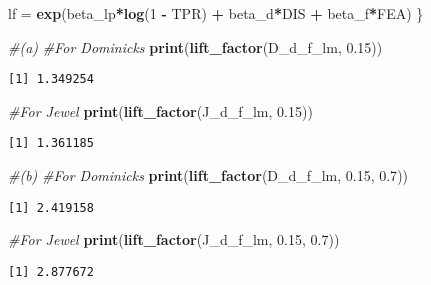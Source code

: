 \documentclass[]{article}
\newenvironment{Shaded}{\begin{snugshade}}{\end{snugshade}}
\newcommand{\CommentTok}[1]{\textcolor[rgb]{0.56,0.35,0.01}{\textit{#1}}}
\newcommand{\DecValTok}[1]{\textcolor[rgb]{0.00,0.00,0.81}{#1}}
\newcommand{\FloatTok}[1]{\textcolor[rgb]{0.00,0.00,0.81}{#1}}
\newcommand{\KeywordTok}[1]{\textcolor[rgb]{0.13,0.29,0.53}{\textbf{#1}}}
\newcommand{\NormalTok}[1]{#1}
\newcommand{\OperatorTok}[1]{\textcolor[rgb]{0.81,0.36,0.00}{\textbf{#1}}}
\newcommand{\StringTok}[1]{\textcolor[rgb]{0.31,0.60,0.02}{#1}}
\begin{document}
\begin{Shaded}
\begin{Highlighting}[]
\NormalTok{  lf =}\StringTok{ }\KeywordTok{exp}\NormalTok{(beta_lp}\OperatorTok{*}\KeywordTok{log}\NormalTok{(}\DecValTok{1} \OperatorTok{-}\StringTok{ }\NormalTok{TPR) }\OperatorTok{+}\StringTok{ }\NormalTok{beta_d}\OperatorTok{*}\NormalTok{DIS }\OperatorTok{+}\StringTok{ }\NormalTok{beta_f}\OperatorTok{*}\NormalTok{FEA)}
\NormalTok{\}}


\CommentTok{#(a)}
\CommentTok{#For Dominicks}
\KeywordTok{print}\NormalTok{(}\KeywordTok{lift_factor}\NormalTok{(D_d_f_lm, }\FloatTok{0.15}\NormalTok{))}
\end{Highlighting}
\end{Shaded}

\begin{verbatim}
[1] 1.349254
\end{verbatim}

\begin{Shaded}
\begin{Highlighting}[]
\CommentTok{#For Jewel}
\KeywordTok{print}\NormalTok{(}\KeywordTok{lift_factor}\NormalTok{(J_d_f_lm, }\FloatTok{0.15}\NormalTok{))}
\end{Highlighting}
\end{Shaded}

\begin{verbatim}
[1] 1.361185
\end{verbatim}

\begin{Shaded}
\begin{Highlighting}[]
\CommentTok{#(b)}
\CommentTok{#For Dominicks}
\KeywordTok{print}\NormalTok{(}\KeywordTok{lift_factor}\NormalTok{(D_d_f_lm, }\FloatTok{0.15}\NormalTok{, }\FloatTok{0.7}\NormalTok{))}
\end{Highlighting}
\end{Shaded}

\begin{verbatim}
[1] 2.419158
\end{verbatim}

\begin{Shaded}
\begin{Highlighting}[]
\CommentTok{#For Jewel}
\KeywordTok{print}\NormalTok{(}\KeywordTok{lift_factor}\NormalTok{(J_d_f_lm, }\FloatTok{0.15}\NormalTok{, }\FloatTok{0.7}\NormalTok{))}
\end{Highlighting}
\end{Shaded}

\begin{verbatim}
[1] 2.877672
\end{verbatim}
\end{document}

